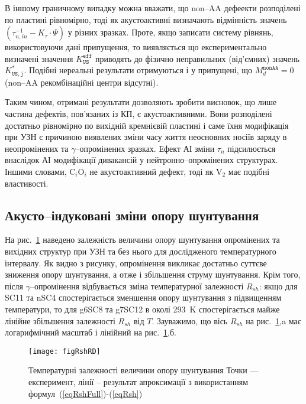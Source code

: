 В іншому граничному випадку можна вважати,
що non--AA дефеекти розподілені по пластині рівномірно,
тоді як акустоактивні визначають відмінність значень $(\tau_{n,in}^{-1}-K_\tau\cdot\Psi)$ у різних зразках.
Проте, якщо записати систему рівнянь, використовуючи дані припущення,
то виявляється що експериментально визначені значення $K_\mathtt{US}^\mathtt{eff}$
приводять до фізично неправильних (від'ємних) значень $K_\mathtt{US,j}^*$.
Подібні нереальні результати отримуються і у припущені, що $M_d^\mathtt{nonAA}=0$
(non--AA рекомбінаційні центри відсутні).

Таким чином, отримані результати дозволяють зробити висновок,
що лише частина дефектів, пов'язаних із КП, є акустоактивними.
Вони розподілені достатньо рівномірно по вихідній кремнієвій пластині і саме їхня модифікація
при УЗН є причиною виявлених зміни часу життя неосновних носіїв заряду в неопромінених та $\gamma$--опромінених зразках.
Ефект АІ зміни $\tau_n$ підсилюється внаслідок АІ модифікації дивакансій у нейтронно--опромінених структурах.
Іншими словами,
C$_i$O$_i$ не акустоактивний дефект, тоді як V$_2$ має подібні властивості.



\subsection{Акусто--індуковані зміни  опору шунтування\label{sbRsh}}

На рис.~\ref{figRshRD} наведено залежність величини  опору шунтування опромінених та вихідних структур
при УЗН та без нього для дослідженого температурного інтервалу.
Як видно з рисунку, опромінення викликає достатньо суттєве зниження  опору шунтування, а отже
і збільшення  струму шунтування.
Крім того, після $\gamma$--опромінення відбувається зміна температурної залежності $R_{sh}$:
якщо для SC11 та nSC4 спостерігається зменшення  опору шунтування з підвищенням температури,
то для g6SC8 та g7SC12 в околі 293~K спостерігається майже лінійне збільшення залежності
$R_{sh}$ від $T$.
Зауважимо, що вісь $R_{sh}$ на рис.~\ref{figRshRD},a має логарифмічний масштаб і лінійний на  рис.~\ref{figRshRD},б.


\begin{figure}
\center
\texttt{[image: figRshRD]}
\caption{\label{figRshRD}
Температурні залежності величини  опору шунтування
\FigCaptionSSCRD
Точки --- експеримент,
лінії -- результат апроксимації з використанням формул~(\ref{eqRshFull})-(\ref{eqRsh})
}%
\end{figure}

